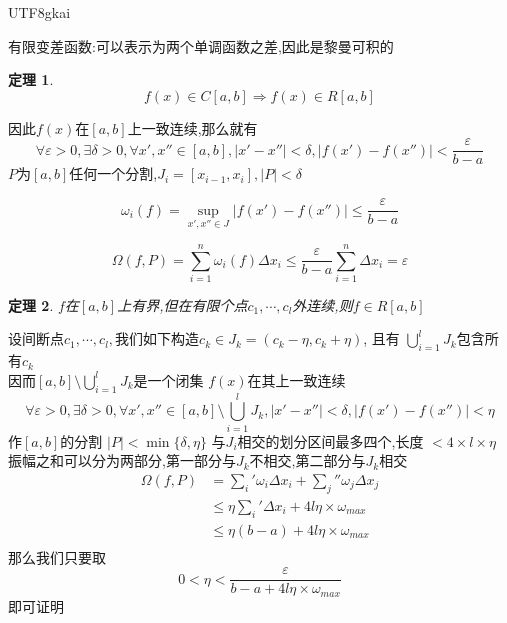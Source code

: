 \documentclass{article}
\newtheorem{theorem}{定理}[subsection]
\newenvironment{cproof}{%
\heiti{证明}\kaishu
}{%
}
\newenvironment{identification}{%
\heiti{定义}\kaishu
}{%
}
\newcommand{\abs}[1]{\left|#1\right|}
\begin{document}
\begin{CJK}{UTF8}{gkai}
\begin{identification}
有限变差函数:可以表示为两个单调函数之差,因此是黎曼可积的\\
\end{identification}

\begin{theorem}
  \[f(x) \in C[a,b] \Rightarrow f(x) \in R[a,b]\]
\end{theorem}

\begin{cproof}
  因此$f(x)$在$[a,b]$上一致连续,那么就有
  \[\forall \varepsilon > 0,\exists \delta > 0 ,\forall x',x'' \in [a,b],|x' - x'' | < \delta , \abs{f(x') - f(x'')}  < \dfrac{\varepsilon}{b - a}\]
  $P$为$[a,b]$任何一个分割,$J_i = [x_{i - 1} , x_i],|P| < \delta$

\[\omega_i(f) = \sup_{x',x''\in J}|f(x') - f(x'')|\leq \dfrac{\varepsilon}{b - a}\]
  
  \[\Omega(f,P) = \sum_{i = 1}^{n} \omega_i(f) \Delta x_i
  \leq\dfrac{\varepsilon}{b - a} \sum_{i = 1}^{n} \Delta x_i
  = \varepsilon\]
\end{cproof}

\begin{theorem}
  $f$在$[a,b]$上有界,但在有限个点$c_1,\cdots,c_l$外连续,则$f\in R[a,b]$
\end{theorem}

\begin{cproof}
  设间断点$c_1,\cdots ,c_l ,$我们如下构造$c_k\in J_k = (c_k - \eta , c_k + \eta ) $, 且有 $\bigcup_{i = 1}^l J_k $包含所有$c_k$\\

  因而$[a,b]\setminus \bigcup_{i = 1}^l J_k$是一个闭集
  $f(x)$在其上一致连续
  \[\forall \varepsilon > 0,\exists \delta > 0 ,\forall x',x'' \in [a,b]\setminus \bigcup_{i = 1}^l J_k,|x' - x'' | < \delta , \abs{f(x') - f(x'')}  < \eta\]
  作$[a,b]$的分割 $|P| < \min\{\delta,\eta\}$
  与$J_i$相交的划分区间最多四个,长度 $< 4 \times l \times \eta$
  振幅之和可以分为两部分,第一部分与$J_k$不相交,第二部分与$J_k$相交
  \[
  \begin{aligned}
  \Omega(f,P) &= \sum_{i}' \omega_i \Delta x_i + \sum_{j}'' \omega_j \Delta x_j\\
  &\leq \eta \sum_{i}'\Delta x_i + 4l\eta \times  \omega_{max}\\
  &\leq \eta(b - a) + 4 l\eta  \times \omega_{max}\\
  \end{aligned}
  \]
  那么我们只要取 \[0 < \eta < \dfrac{\varepsilon}{b - a + 4 l\eta\times\omega_{max}}\]
  即可证明
\end{cproof}


\end{CJK}
\end{document}

